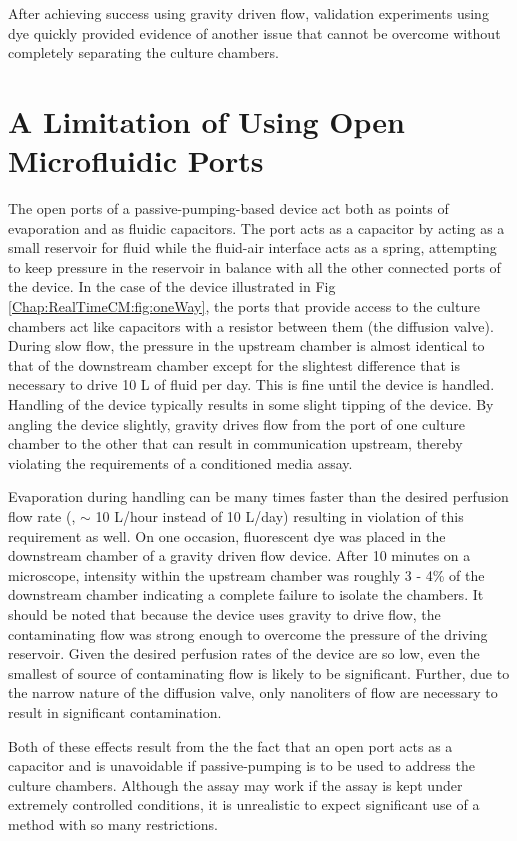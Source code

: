 After achieving success using gravity driven flow, validation experiments using dye quickly provided evidence of another issue that cannot be overcome without completely separating the culture chambers.

\section{A Limitation of Using Open Microfluidic Ports}
The open ports of a passive-pumping-based device act both as points of evaporation and as fluidic capacitors. The port acts as a capacitor by acting as a small reservoir for fluid while the fluid-air interface acts as a spring, attempting to keep pressure in the reservoir in balance with all the other connected ports of the device. In the case of the device illustrated in Fig \ref{Chap:RealTimeCM:fig:oneWay}, the ports that provide access to the culture chambers act like capacitors with a resistor between them (the diffusion valve). During slow flow, the pressure in the upstream chamber is almost identical to that of the downstream chamber except for the slightest difference that is necessary to drive 10 \textmu L of fluid per day. This is fine until the device is handled. Handling of the device typically results in some slight tipping of the device. By angling the device slightly, gravity drives flow from the port of one culture chamber to the other that can result in communication upstream, thereby violating the requirements of a conditioned media assay. 

Evaporation during handling can be many times faster than the desired perfusion flow rate (\ie, $\sim$ 10 \textmu L/hour instead of 10 \textmu L/day) resulting in violation of this requirement as well. On one occasion, fluorescent dye was placed in the downstream chamber of a gravity driven flow device. After 10 minutes on a microscope, intensity within the upstream chamber was roughly 3 - 4\% of the downstream chamber indicating a complete failure to isolate the chambers. It should be noted that because the device uses gravity to drive flow, the contaminating flow was strong enough to overcome the pressure of the driving reservoir. Given the desired perfusion rates of the device are so low, even the smallest of source of contaminating flow is likely to be significant. Further, due to the narrow nature of the diffusion valve, only nanoliters of flow are necessary to result in significant contamination.

Both of these effects result from the the fact that an open port acts as a capacitor and is unavoidable if passive-pumping is to be used to address the culture chambers. Although the assay may work if the assay is kept under extremely controlled conditions, it is unrealistic to expect significant use of a method with so many restrictions.

